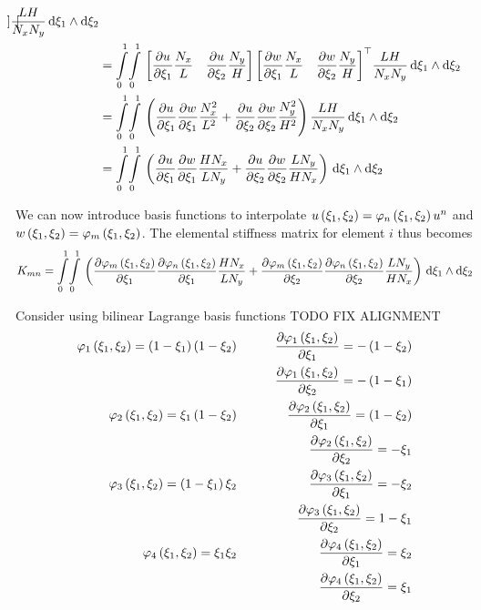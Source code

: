 \begin{equation}
\begin{aligned}
{{\begin{bmatrix}
    \end{bmatrix}}}\dfrac{LH}{N_{x}N_{y}}\,\exteriorderivop\xi_{1}\wedge\exteriorderivop\xi_{2} \\
    &=\giint{0}{1}{0}{1}{\begin{bmatrix}\delby{u}{\xi_{1}}\dfrac{N_{x}}{L}&\delby{u}{\xi_{2}}\dfrac{N_{y}}{H}\end{bmatrix}
      \transpose{\begin{bmatrix}\delby{w}{\xi_{1}}\dfrac{N_{x}}{L}&\delby{w}{\xi_{2}}\dfrac{N_{y}}{H}\end{bmatrix}}
      \dfrac{LH}{N_{x}N_{y}}}{\xi_{1}}{\xi_{2}}\\
    &=\giint{0}{1}{0}{1}{\pbrac{\delby{u}{\xi_{1}}\delby{w}{\xi_{1}}\dfrac{N_{x}^{2}}{L^{2}}+
        \delby{u}{\xi_{2}}\delby{w}{\xi_{2}}\dfrac{N_{y}^{2}}{H^{2}}}\dfrac{LH}{N_{x}N_{y}}}{\xi_{1}}{\xi_{2}}\\
    &=\giint{0}{1}{0}{1}{\pbrac{\delby{u}{\xi_{1}}\delby{w}{\xi_{1}}\dfrac{H N_{x}}{L N_{y}}+
        \delby{u}{\xi_{2}}\delby{w}{\xi_{2}}\dfrac{L N_{y}}{H N_{x}}}}{\xi_{1}}{\xi_{2}}
  \end{aligned}
\end{equation}

We can now introduce basis functions to interpolate
$\fnof{u}{\xi_{1},\xi_{2}}=\lbfn{n}{\xi_{1},\xi_{2}}\nodept{u}{n}$ and
$\fnof{w}{\xi_{1},\xi_{2}}=\lbfn{m}{\xi_{1},\xi_{2}}$. The elemental
stiffness matrix for element $i$ thus becomes
\begin{equation}
  K_{mn}=\giint{0}{1}{0}{1}{\pbrac{\delby{\lbfn{m}{\xi_{1},\xi_{2}}}{\xi_{1}}\delby{\lbfn{n}{\xi_{1},\xi_{2}}}{\xi_{1}}
      \dfrac{H N_{x}}{L N_{y}}+\delby{\lbfn{m}{\xi_{1},\xi_{2}}}{\xi_{2}}\delby{\lbfn{n}{\xi_{1},\xi_{2}}}{\xi_{2}}
      \dfrac{L N_{y}}{H N_{x}}}}{\xi_{1}}{\xi_{2}}
\end{equation}

Consider using bilinear Lagrange basis functions \ie TODO FIX
ALIGNMENT
\begin{equation}
  \begin{aligned}
    \lbfn{1}{\xi_{1},\xi_{2}}=\pbrac{1-\xi_{1}}\pbrac{1-\xi_{2}}&\quad&\delby{\lbfn{1}{\xi_{1},\xi_{2}}}{\xi_{1}}=-\pbrac{1-\xi_{2}}\\ &&\delby{\lbfn{1}{\xi_{1},\xi_{2}}}{\xi_{2}}=-\pbrac{1-\xi_{1}}
    \\ \lbfn{2}{\xi_{1},\xi_{2}}=\xi_{1}\pbrac{1-\xi_{2}}&\qquad&\delby{\lbfn{2}{\xi_{1},\xi_{2}}}{\xi_{1}}=\pbrac{1-\xi_{2}}
    \\ &&\delby{\lbfn{2}{\xi_{1},\xi_{2}}}{\xi_{2}}=-\xi_{1}
    \\ \lbfn{3}{\xi_{1},\xi_{2}}=\pbrac{1-\xi_{1}}\xi_{2}&\qquad&\delby{\lbfn{3}{\xi_{1},\xi_{2}}}{\xi_{1}}=-\xi_{2}
    \\ &&\delby{\lbfn{3}{\xi_{1},\xi_{2}}}{\xi_{2}}=1-\xi_{1}
    \\ \lbfn{4}{\xi_{1},\xi_{2}}=\xi_{1}\xi_{2}&\qquad&\delby{\lbfn{4}{\xi_{1},\xi_{2}}}{\xi_{1}}=\xi_{2}
    \\ &&\delby{\lbfn{4}{\xi_{1},\xi_{2}}}{\xi_{2}}=\xi_{1}
  \end{aligned}
\end{equation}

